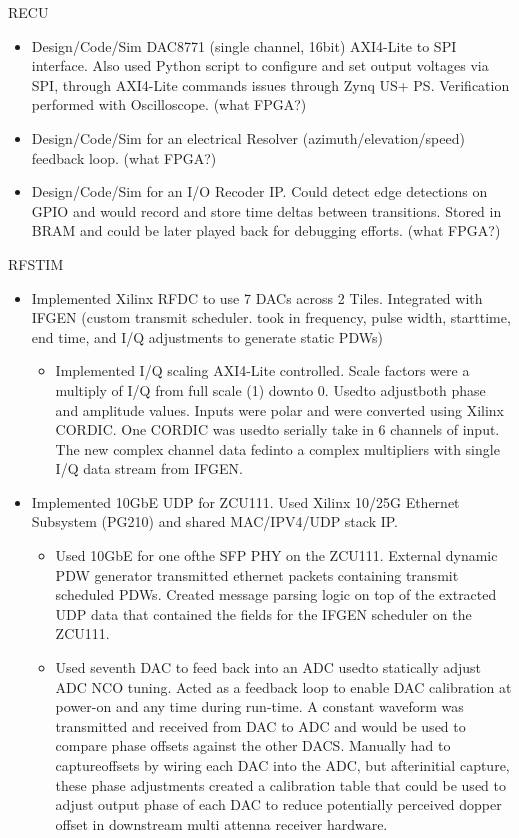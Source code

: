 \documentclass[10pt,final,sans]{resume}
\begin{document}
  RECU
  \begin{itemize}
    \item Design/Code/Sim DAC8771 (single channel, 16bit) AXI4-Lite to SPI interface. Also used Python script to configure and set output voltages via SPI, through AXI4-Lite commands issues through Zynq US+ PS. Verification performed with Oscilloscope. (what FPGA?)
    \item Design/Code/Sim for an electrical Resolver (azimuth/elevation/speed) feedback loop. (what FPGA?)
    \item Design/Code/Sim for an I/O Recoder IP. Could detect edge detections on GPIO and would record and store time deltas between transitions. Stored in BRAM and could be later played back for debugging efforts. (what FPGA?)
  \end{itemize}

  RFSTIM
  \begin{itemize}
  \item Implemented Xilinx RFDC to use 7 DACs across 2 Tiles. Integrated with IFGEN (custom transmit scheduler. took in frequency, pulse width, starttime, end time, and I/Q adjustments to generate static PDWs)
    \begin{itemize}
      \item Implemented I/Q scaling AXI4-Lite controlled. Scale factors were a multiply of I/Q from full scale (1) downto 0. Usedto adjustboth phase and amplitude values. Inputs were polar and were converted using Xilinx CORDIC. One CORDIC was usedto serially take in 6 channels of input. The new complex channel data fedinto a complex multipliers with single I/Q data stream from IFGEN.
    \end{itemize}
    \item Implemented 10GbE UDP for ZCU111. Used Xilinx 10/25G Ethernet Subsystem (PG210) and shared MAC/IPV4/UDP stack IP.
    \begin{itemize}
      \item Used 10GbE for one ofthe SFP PHY on the ZCU111. External dynamic PDW generator transmitted ethernet packets containing transmit scheduled PDWs. Created message parsing logic on top of the extracted UDP data that contained the fields for the IFGEN scheduler on the ZCU111.
      \item Used seventh DAC to feed back into an ADC usedto statically adjust ADC NCO tuning. Acted as a feedback loop to enable DAC calibration at power-on and any time during run-time. A constant waveform was transmitted and received from DAC to ADC and would be used to compare phase offsets against the other DACS. Manually had to captureoffsets by wiring each DAC into the ADC, but afterinitial capture, these phase adjustments created a calibration table that could be used to adjust output phase of each DAC to reduce potentially perceived dopper offset in downstream multi attenna receiver hardware.
    \end{itemize}
  \end{itemize}
\end{document}
